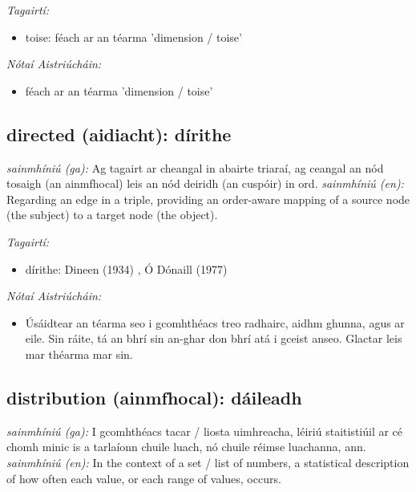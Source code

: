 \documentclass{article}
\begin{document}
 \noindent \textit{Tagairtí:}
\begin{itemize}
	\item toise: féach ar an téarma 'dimension / toise'
\end{itemize}

 \noindent \textit{Nótaí Aistriúcháin:}
\begin{itemize}
	\item féach ar an téarma 'dimension / toise'
\end{itemize}


\subsection*{directed (aidiacht): dírithe} 
 \noindent \textit{sainmhíniú (ga):} Ag tagairt ar cheangal in abairte triaraí, ag ceangal an nód tosaigh (an ainmfhocal) leis an nód deiridh (an cuspóir) in ord.
\newline\newline
 \noindent \textit{sainmhíniú (en):} Regarding an edge in a triple, providing an order-aware mapping of a source node (the subject) to a target node (the object).
\newline

 \noindent \textit{Tagairtí:}
\begin{itemize}
	\item dírithe: Dineen (1934) \cite{dineen}, Ó Dónaill (1977) \cite{odonaill}
\end{itemize}

 \noindent \textit{Nótaí Aistriúcháin:}
\begin{itemize}
	\item Úsáidtear an téarma seo i gcomhthéacs treo radhairc, aidhm ghunna, agus ar eile. Sin ráite, tá an bhrí sin an-ghar don bhrí atá i gceist anseo. Glactar leis mar théarma mar sin.
\end{itemize}


\subsection*{distribution (ainmfhocal): dáileadh} 
 \noindent \textit{sainmhíniú (ga):} I gcomhthéacs tacar / liosta uimhreacha, léiriú staitistiúil ar cé chomh minic is a tarlaíonn chuile luach, nó chuile réimse luachanna, ann.
\newline\newline
 \noindent \textit{sainmhíniú (en):} In the context of a set / list of numbers, a statistical description of how often each value, or each range of values, occurs.
\newline
\end{document}
